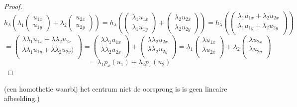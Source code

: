 \documentclass[lineaire_algebra_oplossingen.tex]{subfiles}
\begin{document}
\begin{enumerate}
\begin{enumerate}[a)]
\begin{proof}
\[
h_\lambda \left(\lambda_1
\begin{pmatrix}
u_{1x}\\u_{1y}
\end{pmatrix} 
+ \lambda_2
\begin{pmatrix}
u_{2x}\\u_{2y}
\end{pmatrix} \right)
 = 
h_\lambda \left(
\begin{pmatrix}
\lambda_1u_{1x}\\\lambda_1u_{1y}
\end{pmatrix} 
+ 
\begin{pmatrix}
\lambda_2u_{2x}\\\lambda_2u_{2y}
\end{pmatrix} \right)
=
h_\lambda \left(
\begin{pmatrix}
\lambda_1u_{1x}+\lambda_2u_{2x}\\\lambda_1u_{1y}+\lambda_2u_{2y}\\
\end{pmatrix} \right)
\]
\[
= 
\begin{pmatrix}
\lambda\lambda_1u_{1x}+\lambda\lambda_2u_{2x}\\\lambda\lambda_1u_{1y}+\lambda\lambda_2u_{2y})\\
\end{pmatrix} 
=
\begin{pmatrix}
\lambda\lambda_1u_{1x}\\\lambda\lambda_2u_{2x}\\
\end{pmatrix}
+
\begin{pmatrix}
\lambda\lambda_2u_{2x}\\\lambda\lambda_2u_{2y}\\
\end{pmatrix}
=
\lambda_1
\begin{pmatrix}
\lambda u_{1x}\\\lambda u_{2x}\\
\end{pmatrix}
+
\lambda_2
\begin{pmatrix}
\lambda u_{2x}\\\lambda u_{2y}\\
\end{pmatrix}
\]
\[
=
\lambda_1p_x(u_1) + \lambda_2p_x(u_2)
\]
\end{proof}
(een homothetie waarbij het centrum niet de oorsprong is is geen lineaire afbeelding.)
\end{enumerate}

\end{enumerate}
\end{document}
